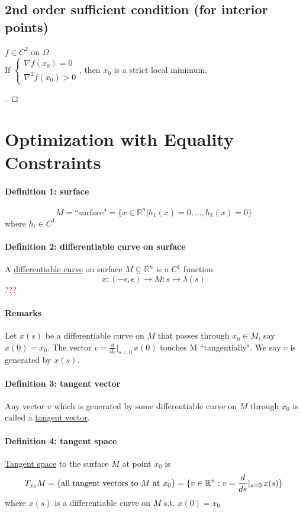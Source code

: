 \documentclass[11pt]{article}
\newcommand{\real}[0]{\mathbb{R}}
\newcommand{\under}[1]{\underline{#1}}
\newcommand{\q}[0]{\textcolor{red}{???}}
\begin{document}
\subsection{2nd order sufficient condition (for interior points)}
$f \in C^2$ on $\Omega$ \\
If $\begin{cases}
	\nabla f(x_0) = 0 \\
	\nabla^2 f(x_0) > 0
\end{cases}$, then $x_0$ is a strict local minimum.
\begin{proof}
	[ ]
\end{proof}


\section{Optimization with Equality Constraints}
\paragraph{Definition 1: surface}
$$M =  \text{``surface"}  = \{ x \in \real^n | h_1(x) = 0, \hdots, h_k(x) = 0\}$$ 
where $h_i \in C^1$

\paragraph{Definition 2: differentiable curve on surface}
A \under{differentiable curve} on surface $M \subseteq \real^n$ is a $C^1$ function
$$ x: (-\epsilon, \epsilon) \rightarrow M: s \mapsto \lambda(s)$$ \q
\paragraph{Remarks}
Let $x(s)$ be a differentiable curve on $M$ that passes through $x_0 \in M$, say $x(0) = x_0$. The vector $v = \frac{d}{ds}|_{s=0} \, x(0)$ touches M ``tangentially". We say $v$ is generated by $x(s)$.
\paragraph{Definition 3: tangent vector}
Any vector $v$ which is generated by some differentiable curve on $M$ through $x_0$ is called a \under{tangent vector}.

\paragraph{Definition 4: tangent space}
\under{Tangent space} to the surface $M$ at point $x_0$ is
$$T_{x_0} M = \{ \text{all tangent vectors to $M$ at $x_0$} \} \\
= \{v \in \real^n: v = \frac{d}{ds} |_{s=0} \, x(s)\}$$
where $x(s)$ is a differentiable curve on $M$ s.t. $x(0) = x_0$
\end{document}
